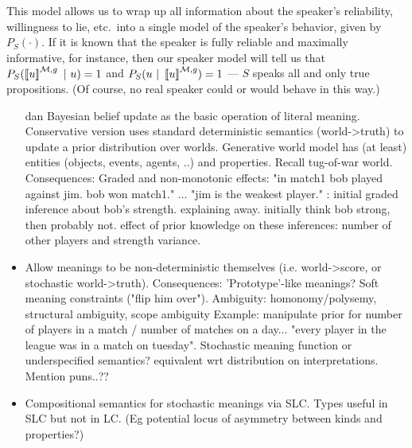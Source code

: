 \documentclass[12pt]{article}
\newcommand{\llbracket}{\ensuremath{\left [\!\left [}}%
\newcommand{\rrbracket}{\ensuremath{\right ]\!\right ]}}
\providecommand{\sv}[1]{\ensuremath{\llbracket #1 \rrbracket}}
\begin{document}
This model allows us to wrap up all information about the speaker's reliability, willingness to lie, etc.\ into a single model of the speaker's behavior, given by $P_{S}(\cdot)$. If it is known that the speaker is fully reliable and maximally informative, for instance, then our speaker model will tell us that $P_{S}(\sv{u}^{\mathcal{M},g} \ |\ u) = 1$ and $P_{S}(u\ |\ \sv{u}^{\mathcal{M},g}) = 1$ --- $S$ speaks all and only true propositions. (Of course, no real speaker could or would behave in this way.)

%
%

%



\begin{itemize}  
\item [dan] Bayesian belief update as the basic operation of literal meaning.
\subitem     Conservative version uses standard deterministic semantics (world->truth) to update a prior distribution over worlds.
\subitem     Generative world model has (at least) entities (objects, events, agents, ..) and properties. Recall tug-of-war world.
\subitem[(ndg)]     Consequences:  Graded and non-monotonic effects: 
"in match1 bob played against jim. bob won match1." ... "jim is the weakest player." : initial graded inference about bob's strength. explaining away. initially think bob strong, then probably not. effect of prior knowledge on these inferences: number of other players and strength variance.


\item  Allow meanings to be non-deterministic themselves (i.e. world->score, or stochastic world->truth).
\subitem     Consequences: 'Prototype'-like meanings? Soft meaning constraints ("flip him over").
\subitem     Ambiguity:  homonomy/polysemy, structural ambiguity, scope ambiguity 
\subitem     Example: manipulate prior for number of players in a match / number of matches on a day... "every player in the league was in a match on tuesday".
\subitem     Stochastic meaning function or underspecified semantics? equivalent wrt distribution on interpretations.
\subitem     Mention puns..??
        
\item  Compositional semantics for stochastic meanings via SLC.
\subitem     Types useful in SLC but not in LC. (Eg potential locus of asymmetry between kinds and properties?)

\end{itemize}
\end{document}
